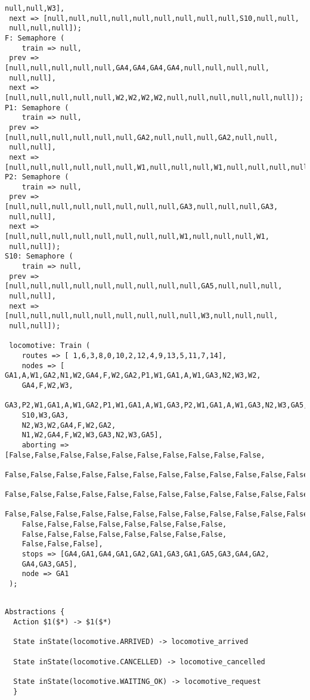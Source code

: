 \begin{lstlisting}[caption={oggetti istanziati nella simulazione}]
 null,null,W3],
 next => [null,null,null,null,null,null,null,null,null,S10,null,null,
 null,null,null]);
F: Semaphore (
    train => null,
 prev => [null,null,null,null,null,GA4,GA4,GA4,GA4,null,null,null,null,
 null,null],
 next => [null,null,null,null,null,W2,W2,W2,W2,null,null,null,null,null,null]);
P1: Semaphore (
    train => null,
 prev => [null,null,null,null,null,null,GA2,null,null,null,GA2,null,null,
 null,null],
 next => [null,null,null,null,null,null,W1,null,null,null,W1,null,null,null,null]);
P2: Semaphore (
    train => null,
 prev => [null,null,null,null,null,null,null,null,GA3,null,null,null,GA3,
 null,null],
 next => [null,null,null,null,null,null,null,null,W1,null,null,null,W1,
 null,null]);
S10: Semaphore (
    train => null,
 prev => [null,null,null,null,null,null,null,null,null,GA5,null,null,null,
 null,null],
 next => [null,null,null,null,null,null,null,null,null,W3,null,null,null,
 null,null]);
 
 locomotive: Train (
 	routes => [ 1,6,3,8,0,10,2,12,4,9,13,5,11,7,14],
 	nodes => [ GA1,A,W1,GA2,N1,W2,GA4,F,W2,GA2,P1,W1,GA1,A,W1,GA3,N2,W3,W2,
 	GA4,F,W2,W3,
 	GA3,P2,W1,GA1,A,W1,GA2,P1,W1,GA1,A,W1,GA3,P2,W1,GA1,A,W1,GA3,N2,W3,GA5,
 	S10,W3,GA3,
 	N2,W3,W2,GA4,F,W2,GA2,
 	N1,W2,GA4,F,W2,W3,GA3,N2,W3,GA5],
 	aborting => [False,False,False,False,False,False,False,False,False,False,
 	False,False,False,False,False,False,False,False,False,False,False,False,
 	False,False,False,False,False,False,False,False,False,False,False,False,
 	False,False,False,False,False,False,False,False,False,False,False,False,
 	False,False,False,False,False,False,False,False,
 	False,False,False,False,False,False,False,False,
 	False,False,False],
 	stops => [GA4,GA1,GA4,GA1,GA2,GA1,GA3,GA1,GA5,GA3,GA4,GA2,
 	GA4,GA3,GA5],
 	node => GA1
 );
 
\end{lstlisting}

\begin{lstlisting}[caption={Astrazioni per la verifica delle proprieta'}]
Abstractions {
  Action $1($*) -> $1($*)
    
  State inState(locomotive.ARRIVED) -> locomotive_arrived

  State inState(locomotive.CANCELLED) -> locomotive_cancelled

  State inState(locomotive.WAITING_OK) -> locomotive_request
  }
\end{lstlisting}